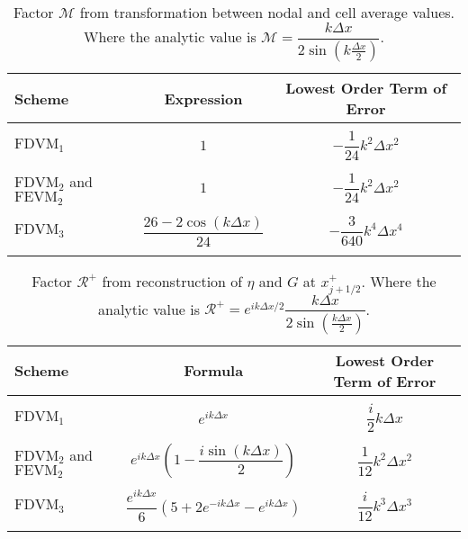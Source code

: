 \begin{table}
	\centering
	\begin{tabular}{l  c  c}
		Scheme& Expression& Lowest Order Term of Error \\
		\hline && \\
		$\text{FDVM}_1$ & $1$ & $-\dfrac{1}{24}k^2 \Delta x^2$ \\ & & \\
		$\text{FDVM}_2$ and $\text{FEVM}_2$& $1$ & $-\dfrac{1}{24}k^2 \Delta x^2$ \\ & & \\
		$\text{FDVM}_3$& $\dfrac{26 - 2 \cos\left(k \Delta x\right)}{24}$ & $-\dfrac{3}{640}k^4 \Delta x^4$ \\ & & \\
	\end{tabular}
	\caption{Factor $\mathcal{M}$ from transformation between nodal and cell average values. Where the analytic value is $\mathcal{M} = \dfrac{k\Delta x}{2 \sin \left(k\frac{\Delta x}{2}\right)  }$.}
	\label{tab:Mfactor}
\end{table}
%
\begin{table}
\centering
	\begin{tabular}{l  c  c}
		Scheme& Formula& Lowest Order Term of Error\\
		\hline && \\
		$\text{FDVM}_1$ & $e^{i k {\Delta x}}$ & $\dfrac{i}{2}k \Delta x$ \\ & & \\
		$\text{FDVM}_2$ and $\text{FEVM}_2$& $e^{i k {\Delta x}} \left(1 - \dfrac{i \sin\left(k\Delta x \right)}{2} \right)$ & $\dfrac{1}{12}k^2 \Delta x^2$ \\ & & \\
		$\text{FDVM}_3$& $\dfrac{e^{i k {\Delta x}}}{6}\left({5 + 2e^{-i k {\Delta x}} - e^{i k {\Delta x}}} \right)$ & $\dfrac{i}{12}k^3 \Delta x^3$ \\ & & \\
	\end{tabular}
	\caption{Factor $\mathcal{R}^+$ from reconstruction of $\eta$ and $G$ at $x^+_{j+1/2}$. Where the analytic value is $\mathcal{R}^+ =e^{i k \Delta x/2} \dfrac{k\Delta x}{2 \sin\left(\frac{k \Delta x}{2}\right)}$. }
	\label{tab:Rpfactor}
\end{table}
%
